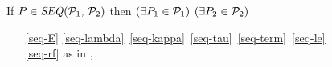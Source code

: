 \begin{figure}
  \noindent
  If $\aPS \in \sSEMI{\aPSS_1}{\aPSS_2}$ then $(\exists P_1\in\mathcal{P}_1)$
  $(\exists P_2\in\mathcal{P}_2)$\\
  \begin{multicols}{2}
    \begin{enumerate}[topsep=0pt,label=(\textsc{s}\arabic*),ref=\textsc{s}\arabic*]
    \item[\eqref{seq-E}]
      \eqref{seq-lambda}\,
      \eqref{seq-kappa}\,
      \eqref{seq-tau}\,
      \eqref{seq-term}\,
      \eqref{seq-le}\, 
      \eqref{seq-rf}
      as in ,
      \setcounter{enumi}{\value{le}}

\end{enumerate}
\end{multicols}
\end{figure}
